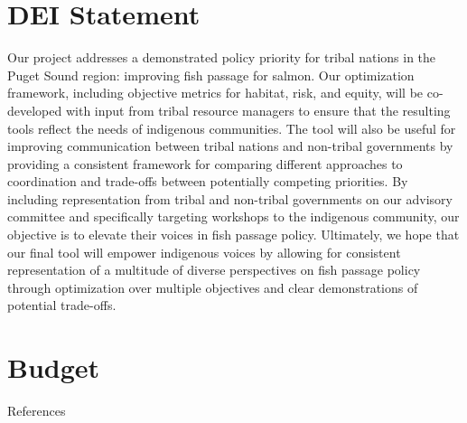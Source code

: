\documentclass[12pt]{elsarticle}
\begin{document}
	\section{DEI Statement}
	Our project addresses a demonstrated policy priority for tribal nations in the Puget Sound region: improving fish passage for salmon. Our optimization framework, including objective metrics for habitat, risk, and equity, will be co-developed with input from tribal resource managers to ensure that the resulting tools reflect the needs of indigenous communities. The tool will also be useful for improving communication between tribal nations and non-tribal governments by providing a consistent framework for comparing different approaches to coordination and trade-offs between potentially competing priorities. By including representation from tribal and non-tribal governments on our advisory committee and specifically targeting workshops to the indigenous community, our objective is to elevate their voices in fish passage policy. Ultimately, we hope that our final tool will empower indigenous voices by allowing for consistent representation of a multitude of diverse perspectives on fish passage policy through optimization over multiple objectives and clear demonstrations of potential trade-offs.
	
	\section{Budget}
	
	
	\clearpage
	\large References\\
	\normalsize
	
\end{document}

